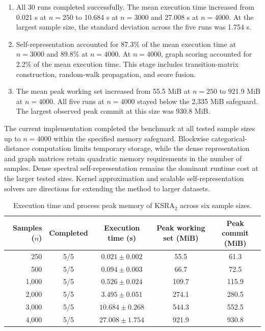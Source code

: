 \documentclass[ASNA,twocolumn]{USG} %
\begin{document}
\begin{enumerate}[\indent (1)]
    \item All 30 runs completed successfully. The mean execution time increased from 0.021 s at $n=250$ to 10.684 s at $n=3000$ and 27.008 s at $n=4000$. At the largest sample size, the standard deviation across the five runs was 1.754 s.
    
    \item Self-representation accounted for 87.3\% of the mean execution time at $n=3000$ and 89.8\% at $n=4000$. At $n=4000$, graph scoring accounted for 2.2\% of the mean execution time. This stage includes transition-matrix construction, random-walk propagation, and score fusion.

    \item The mean peak working set increased from 55.5 MiB at $n=250$ to 921.9 MiB at $n=4000$. All five runs at $n=4000$ stayed below the 2,335 MiB safeguard. The largest observed peak commit at this size was 930.8 MiB.
\end{enumerate}

The current implementation completed the benchmark at all tested sample sizes up to $n=4000$ within the specified memory safeguard. Blockwise categorical-distance computation limits temporary storage, while the dense representation and graph matrices retain quadratic memory requirements in the number of samples. Dense spectral self-representation remains the dominant runtime cost at the larger tested sizes. Kernel approximation and scalable self-representation solvers are directions for extending the method to larger datasets.

\begin{table}[!ht]
    \centering
    \caption{Execution time and process peak memory of KSRA$_2$ across six sample sizes. }
    \label{tab:ksra_scalability}
    \begin{tabular}{rcccc}
        \toprule
        Samples ($n$) &
        Completed &
        Execution time (s) &
        Peak working set (MiB) &
        Peak commit (MiB) \\
        \midrule
          250  & 5/5 & $0.021 \pm 0.002$  &  55.5 &  61.3 \\
          500  & 5/5 & $0.094 \pm 0.003$  &  66.7 &  72.5 \\
        1,000  & 5/5 & $0.526 \pm 0.024$  & 109.7 & 115.9 \\
        2,000  & 5/5 & $3.495 \pm 0.051$  & 274.1 & 280.5 \\
        3,000  & 5/5 & $10.684 \pm 0.268$ & 544.3 & 552.5 \\
        4,000  & 5/5 & $27.008 \pm 1.754$ & 921.9 & 930.8 \\
        \bottomrule
    \end{tabular}
\end{table}
\end{document}

